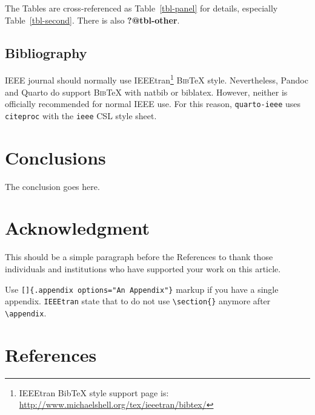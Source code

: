 \documentclass[
  journal,
]{IEEEtran}%
\theoremstyle{plain}
\theoremstyle{remark}
\begin{document}
The Tables are cross-referenced as Table~\ref{tbl-panel} for details,
especially Table~\ref{tbl-second}. There is also \textbf{?@tbl-other}.

\subsection{Bibliography}\label{bibliography}

IEEE journal should normally use IEEEtran\footnote{IEEEtran BibTeX style
  support page is:
  \url{http://www.michaelshell.org/tex/ieeetran/bibtex/}}
\textsc{Bib}{\TeX} style. Nevertheless, Pandoc and Quarto do support
\textsc{Bib}{\TeX} with natbib or biblatex. However, neither is
officially recommended for normal IEEE use. For this reason,
\texttt{quarto-ieee} uses \texttt{citeproc} with the \texttt{ieee} CSL
style sheet.

\section{Conclusions}\label{conclusions}

The conclusion goes here.

\section*{Acknowledgment}\label{acknowledgment}

This should be a simple paragraph before the References to thank those
individuals and institutions who have supported your work on this
article.

\appendix[An Appendix]{}

Use \texttt{{[}{]}\{.appendix\ options="An\ Appendix"\}} markup if you
have a single appendix. \texttt{IEEEtran} state that to do not use
\texttt{\textbackslash{}section\{\}} anymore after
\texttt{\textbackslash{}appendix}.

\section*{References}\label{references}
\end{document}
